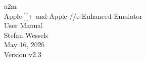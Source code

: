 \begin{titlepage}
  \thispagestyle{empty}
  \centering
  \vspace*{\fill}
  {\Huge a2m}\\[1em]
  {\Large Apple ][+ and Apple //e Enhanced Emulator}\\[1em]
  {\Large User Manual}\\[2em]
  {\large Stefan Wessels}\\[0.5em]
  {\large May 16, 2026}\\[3em]
  {\small Version v2.3}
  \vspace*{\fill}
\end{titlepage}
\clearpage
\tableofcontents
\clearpage